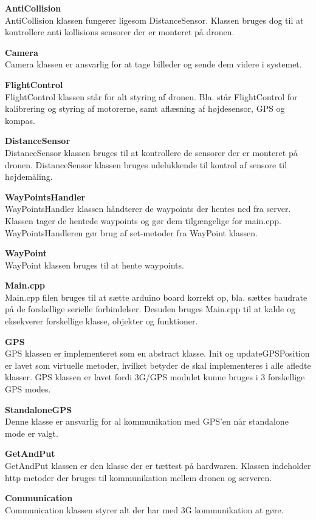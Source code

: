 \textbf{AntiCollision} \\
AntiCollision klassen fungerer ligesom DistanceSensor. Klassen bruges dog til at kontrollere anti kollisions sensorer der er monteret på dronen. 

\textbf{Camera} \\
Camera klassen er ansvarlig for at tage billeder og sende dem videre i systemet. 

\textbf{FlightControl} \\
FlightControl klassen står for alt styring af dronen. Bla. står FlightControl for kalibrering og styring af motorerne, samt aflæsning af højdesensor, GPS og kompas. 

\textbf{DistanceSensor} \\
DistanceSensor klassen bruges til at kontrollere de sensorer der er monteret på dronen. DistanceSensor klassen bruges udelukkende til kontrol af sensore til højdemåling. 

\textbf{WayPointsHandler} \\
WayPointsHandler klassen håndterer de waypoints der hentes ned fra server. Klassen tager de hentede waypoints og gør dem tilgængelige for main.cpp. WayPointsHandleren gør brug af set-metoder fra WayPoint klassen.

\textbf{WayPoint} \\
WayPoint klassen bruges til at hente waypoints.  

\textbf{Main.cpp} \\
Main.cpp filen bruges til at sætte arduino board korrekt op, bla. sættes baudrate på de forskellige serielle forbindelser. Desuden bruges Main.cpp til at kalde og eksekverer forskellige klasse, objekter og funktioner.

\textbf{GPS} \\
GPS klassen er implementeret som en abstract klasse. Init og updateGPSPosition er lavet som virtuelle metoder, hvilket betyder de skal implementeres i alle afledte klasser. GPS klassen er lavet fordi 3G/GPS modulet kunne bruges i 3 forskellige GPS modes. 

\textbf{StandaloneGPS}\\
Denne klasse er ansvarlig for al kommunikation med GPS'en når standalone mode er valgt. 

\textbf{GetAndPut} \\
GetAndPut klassen er den klasse der er tættest på hardwaren. Klassen indeholder http metoder der bruges til kommunikation mellem dronen og serveren. 

\textbf{Communication} \\
Communication klassen styrer alt der har med 3G kommunikation at gøre.

